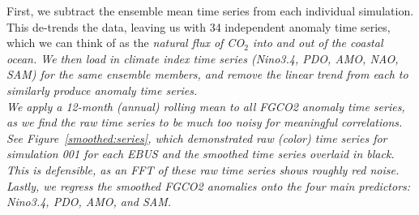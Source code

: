 \documentclass[12pt]{article}
\begin{document}
First, we subtract the ensemble mean time series from each individual simulation. This de-trends the data, leaving us with 34 independent anomaly time series, which we can think of as the \it natural \rm flux of CO$_{2}$ into and out of the coastal ocean. We then load in climate index time series (Nino3.4, PDO, AMO, NAO, SAM) for the same ensemble members, and remove the linear trend from each to similarly produce anomaly time series. \\


We apply a 12-month (annual) rolling mean to all FGCO2 anomaly time series, as we find the raw time series to be much too noisy for meaningful correlations. See Figure~\ref{smoothed:series}, which demonstrated raw (color) time series for simulation 001 for each EBUS and the smoothed time series overlaid in black. This is defensible, as an FFT of these raw time series shows roughly red noise. \\

Lastly, we regress the smoothed FGCO2 anomalies onto the four main predictors: Nino3.4, PDO, AMO, and SAM. 
\end{document}
